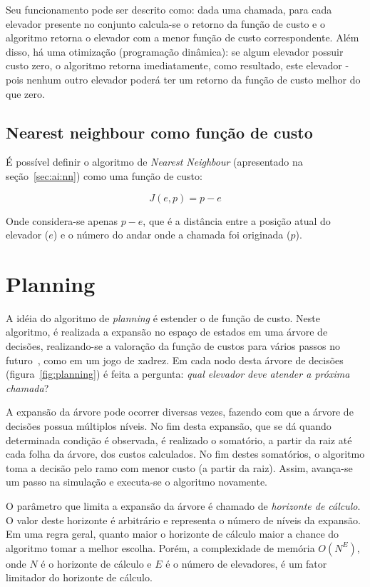 Seu funcionamento pode ser descrito como: dada uma chamada, para cada elevador
presente no conjunto calcula-se o retorno da função de custo e o algoritmo
retorna o elevador com a menor função de custo correspondente. Além disso, há
uma otimização (programação dinâmica): se algum elevador possuir custo zero, o
algoritmo retorna imediatamente, como resultado, este elevador - pois nenhum
outro elevador poderá ter um retorno da função de custo melhor do que zero.

\subsection{Nearest neighbour como função de custo}

É possível definir o algoritmo de \textit{Nearest Neighbour} (apresentado na
seção~\ref{sec:ai:nn}) como uma função de custo:

\[J(e, p) = p - e\]

Onde considera-se apenas $p - e$, que é a distância entre a posição atual do
elevador ($e$) e o número do andar onde a chamada foi originada ($p$).

\section{\label{sec:ai:planning}Planning}

A idéia do algoritmo de \textit{planning} é estender o de função de custo. Neste
algoritmo, é realizada a expansão no espaço de estados em uma árvore de
decisões, realizando-se a valoração da função de custos para vários passos no
futuro~\cite{Koehler00elevatorcontrol}, como em um jogo de xadrez. Em cada nodo
desta árvore de decisões (figura~\ref{fig:planning}) é feita a pergunta:
\textit{qual elevador deve atender a próxima chamada}?

A expansão da árvore pode ocorrer diversas vezes, fazendo com que a árvore de
decisões possua múltiplos níveis. No fim desta expansão, que se dá quando
determinada condição é observada, é realizado o somatório, a partir da raiz até
cada folha da árvore, dos custos calculados. No fim destes somatórios, o
algoritmo toma a decisão pelo ramo com menor custo (a partir da raiz). Assim,
avança-se um passo na simulação e executa-se o algoritmo novamente.

O parâmetro que limita a expansão da árvore é chamado de \textit{horizonte de
cálculo}. O valor deste horizonte é arbitrário e representa o número de níveis
da expansão. Em uma regra geral, quanto maior o horizonte de cálculo maior a
chance do algoritmo tomar a melhor escolha. Porém, a complexidade de memória
$O(N^{E})$, onde $N$ é o horizonte de cálculo e $E$ é o número de elevadores,
é um fator limitador do horizonte de cálculo.

